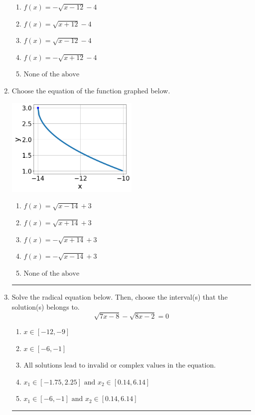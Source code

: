 \documentclass[14pt]{extbook}
\newcommand{\litem}[1]{\item#1\hspace*{-1cm}\rule{\textwidth}{0.4pt}}
\begin{document}
\begin{enumerate}
{\begin{center}
\end{center}
\begin{enumerate}[label=\Alph*.]
\item \( f(x) = - \sqrt{x - 12} - 4 \)
\item \( f(x) = \sqrt{x + 12} - 4 \)
\item \( f(x) = \sqrt{x - 12} - 4 \)
\item \( f(x) = - \sqrt{x + 12} - 4 \)
\item \( \text{None of the above} \)

\end{enumerate} }
\litem{
Choose the equation of the function graphed below.
\begin{center}
    \includegraphics[width=0.5\textwidth]{../Figures/radicalGraphToEquationCopyB.png}
\end{center}
\begin{enumerate}[label=\Alph*.]
\item \( f(x) = \sqrt{x - 14} + 3 \)
\item \( f(x) = \sqrt{x + 14} + 3 \)
\item \( f(x) = - \sqrt{x + 14} + 3 \)
\item \( f(x) = - \sqrt{x - 14} + 3 \)
\item \( \text{None of the above} \)

\end{enumerate} }
\litem{
Solve the radical equation below. Then, choose the interval(s) that the solution(s) belongs to.\[ \sqrt{7 x - 8} - \sqrt{8 x - 2} = 0 \]\begin{enumerate}[label=\Alph*.]
\item \( x \in [-12,-9] \)
\item \( x \in [-6,-1] \)
\item \( \text{All solutions lead to invalid or complex values in the equation.} \)
\item \( x_1 \in [-1.75, 2.25] \text{ and } x_2 \in [0.14,6.14] \)
\item \( x_1 \in [-6, -1] \text{ and } x_2 \in [0.14,6.14] \)


\end{enumerate}}
\end{enumerate}
\end{document}
